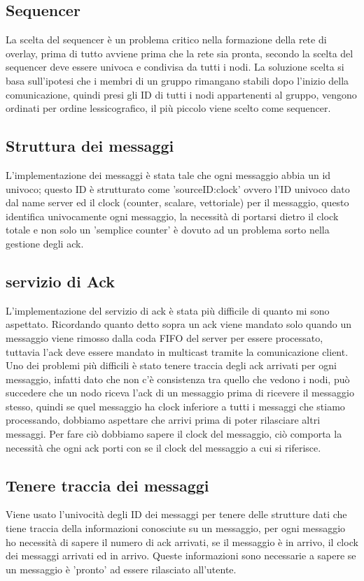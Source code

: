\documentclass[conference]{IEEEtran}
\begin{document}
 \subsection{Sequencer}
 La scelta del sequencer è un problema critico nella formazione della rete di
 overlay, prima di tutto avviene prima che la rete sia pronta, secondo la scelta
 del sequencer deve essere univoca e condivisa da tutti i nodi.
 La soluzione scelta si basa sull'ipotesi che i membri di un gruppo rimangano
 stabili dopo l'inizio della comunicazione, quindi presi gli ID di tutti i nodi
 appartenenti al gruppo, vengono ordinati per ordine lessicografico, il più
 piccolo viene scelto come sequencer.
\subsection{Struttura dei messaggi}
 L'implementazione dei messaggi è stata tale che ogni messaggio abbia un id
 univoco; questo ID è strutturato come 'sourceID:clock' ovvero l'ID univoco dato dal name
 server ed il clock (counter, scalare, vettoriale) per il messaggio, questo
 identifica univocamente ogni messaggio, la necessità di portarsi dietro il
 clock totale e non solo un 'semplice counter' è dovuto ad un problema sorto nella
 gestione degli ack.
\subsection{servizio di Ack}
 L'implementazione del servizio di ack è stata più difficile di quanto mi sono
 aspettato.
 Ricordando quanto detto sopra un ack viene mandato solo quando un
 messaggio viene rimosso dalla coda FIFO del server per essere processato,
 tuttavia l'ack deve essere mandato in multicast tramite la comunicazione
 client.
 Uno dei problemi più difficili è stato tenere traccia degli
 ack arrivati per ogni messaggio, infatti dato che non c'è
 consistenza tra quello che vedono i nodi, può succedere che un nodo riceva
 l'ack di un messaggio prima di ricevere il messaggio stesso, quindi se quel messaggio
 ha clock inferiore a tutti i messaggi che stiamo processando, dobbiamo
 aspettare che arrivi prima di poter rilasciare altri messaggi.
 Per fare ciò dobbiamo sapere il clock del messaggio, ciò comporta la necessità che ogni
 ack porti con se il clock del messaggio a cui si riferisce.
 \subsection{Tenere traccia dei messaggi}
 Viene usato l'univocità degli ID dei messaggi per tenere delle strutture dati
 che tiene traccia della informazioni conosciute su un messaggio, per ogni
 messaggio ho necessità di sapere il numero di ack arrivati, se il messaggio è
 in arrivo, il clock dei messaggi arrivati ed in arrivo.
 Queste informazioni sono necessarie a sapere se un messaggio è 'pronto' ad
 essere rilasciato all'utente.
\end{document}
